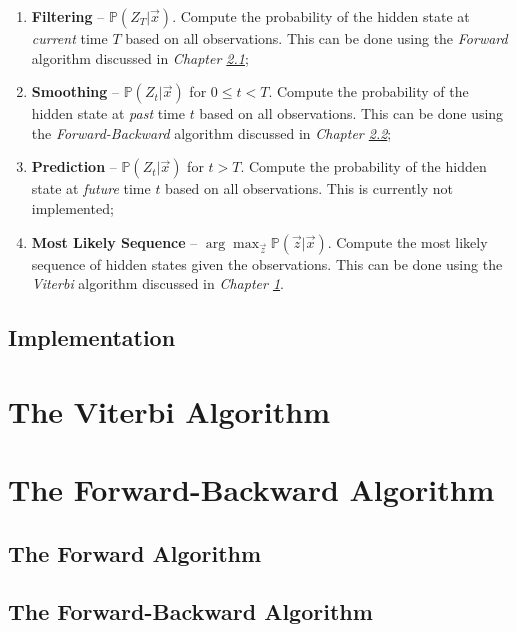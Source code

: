 \documentclass{article}
\theoremstyle{definition}
\renewcommand{\P}{\mathbb{P}}
\begin{document}
\begin{enumerate}
    \item \textbf{Filtering} -- \(\P(Z_T | \vec x)\). Compute the probability of the hidden state at \textit{current} time \(T\) based on all observations. This can be done using the \textit{Forward} algorithm discussed in \textit{Chapter \ref{sec:forward_algorithm}};
    \item \textbf{Smoothing} -- \(\P(Z_t | \vec x)\) for \(0 \leq t < T\). Compute the probability of the hidden state at \textit{past} time \(t\) based on all observations. This can be done using the \textit{Forward-Backward} algorithm discussed in \textit{Chapter \ref{sec:forward_backward_algorithm}};
    \item \textbf{Prediction} -- \(\P(Z_t | \vec x)\) for \(t > T\). Compute the probability of the hidden state at \textit{future} time \(t\) based on all observations. This is currently not implemented;
    \item \textbf{Most Likely Sequence} -- \(\arg \max_{\vec z} \P(\vec z | \vec x)\). Compute the most likely sequence of hidden states given the observations. This can be done using the \textit{Viterbi} algorithm discussed in \textit{Chapter \ref{sec:viterbi_algorithm}}.
\end{enumerate}

\subsection{Implementation}

\pagebreak

\section{The Viterbi Algorithm} \label{sec:viterbi_algorithm}

\pagebreak

\section{The Forward-Backward Algorithm}

\subsection{The Forward Algorithm} \label{sec:forward_algorithm}

\subsection{The Forward-Backward Algorithm} \label{sec:forward_backward_algorithm}
\end{document}
